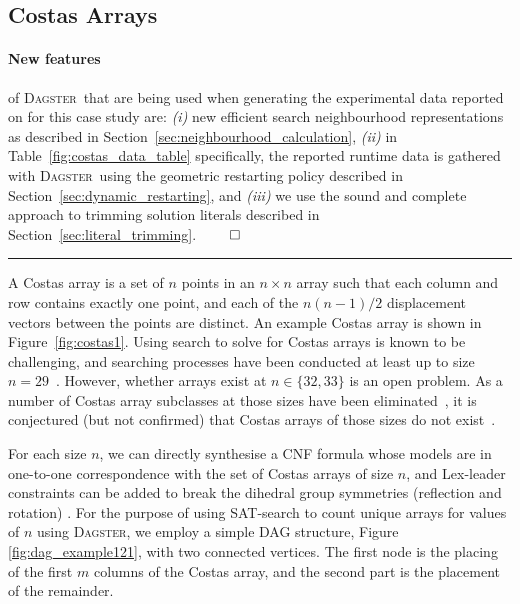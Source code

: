 \documentclass[10pt,a4paper,oneside,headinclude,footinclude,BCOR5mm]{scrartcl}
\newcommand{\dagster}{\textsc{Dagster}\xspace}
\begin{document}
\pagebreak
\subsection{Costas Arrays}\label{sec:experiment_costas}

\paragraph{New features} of \dagster\ that are being used when generating the experimental data reported on for this case study are: {\em (i)} new efficient search neighbourhood representations as described in Section~\ref{sec:neighbourhood_calculation}, {\em (ii)} in Table~\ref{fig:costas_data_table} specifically, the reported runtime data is gathered with \dagster\ using the geometric restarting policy described in Section~\ref{sec:dynamic_restarting}, and {\em (iii)} we use the sound and complete approach to trimming solution literals described in Section~\ref{sec:literal_trimming}. $\qed$\\\rule{50pt}{5pt}


A Costas array is a set of $n$ points in an $n\times n$ array such that each column and row contains exactly one point, and each of the $n(n-1)/2$ displacement vectors between the points are distinct.
An example Costas array is shown in Figure~\ref{fig:costas1}. 
Using search to solve for Costas arrays is known to be challenging, and searching processes have been conducted at least up to size $n=29$~\cite{DBLP:journals/amco/DrakakisIRW11,darakakis:etal:2008}.
However, whether arrays exist at $n\in\{32,33\}$ is an open problem.
As a number of Costas array subclasses at those sizes have been eliminated~\cite{748721}, it is conjectured (but not confirmed) that Costas arrays of those sizes do not exist~\cite{conf/ciss/RussoEB10}.




For each size $n$, we can directly synthesise a CNF formula whose models are in one-to-one correspondence with the set of Costas arrays of size $n$, and Lex-leader constraints can be added to break the dihedral group symmetries (reflection and rotation) \cite{10.1007/11889205_46}.
For the purpose of using SAT-search to count unique arrays for values of $n$ using \dagster,  we employ a simple DAG structure, Figure \ref{fig:dag_example121}, with two connected vertices. The first node is the placing of the first $m$ columns of the Costas array, and the second part is the placement of the remainder.
\end{document}
